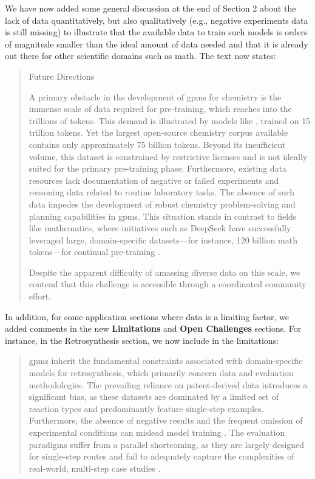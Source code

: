\begin{reply}

We have now added some general discussion at the end of Section 2 about the lack of data quantitatively, but also qualitatively (e.g., negative experiments data is still missing) to illustrate that the available data to train such models is orders of magnitude smaller than the ideal amount of data needed and that it is already out there for other scientific domains such as math. The text now states:

\begin{quote}
    Future Directions

    A primary obstacle in the development of \glspl{gpm} for chemistry is the immense scale of data required for pre-training, which reaches into the trillions of tokens. This demand is illustrated by models like , trained on 15 trillion tokens. Yet the largest open-source chemistry corpus available contains only approximately 75 billion tokens.\autocite{mirza2025chempile0} 
    Beyond its insufficient volume, this dataset is constrained by restrictive licenses and is not ideally suited for the primary pre-training phase. Furthermore, existing data resources lack documentation of negative or failed experiments and reasoning data related to routine laboratory tasks. The absence of such data impedes the development of robust chemistry problem-solving and planning capabilities in \glspl{gpm}. 
    This situation stands in contrast to fields like mathematics, where initiatives such as DeepSeek have successfully leveraged large, domain-specific datasets---for instance, 120 billion math tokens---for continual pre-training \autocite{shao2024deepseekmath0}.
    
    Despite the apparent difficulty of amassing diverse data on this scale, we contend that this challenge is accessible through a coordinated community effort. 
\end{quote}

In addition, for some application sections where data is a limiting factor, we added comments in the new \textbf{Limitations} and \textbf{Open Challenges} sections. For instance, in the Retrosynthesis section, we now include in the limitations:

\begin{quote}
    \glspl{gpm} inherit the fundamental constraints associated with domain-specific models for retrosynthesis, which primarily concern data and evaluation methodologies. The prevailing reliance on patent-derived data introduces a significant bias, as these datasets are dominated by a limited set of reaction types and predominantly feature single-step examples. Furthermore, the absence of negative results and the frequent omission of experimental conditions can mislead model training \autocite{Lee2024noise, Voinarovska2023when, Saebi2023onthe, Maloney2023negative, Tadanki2025dissecting}. The evaluation paradigms suffer from a parallel shortcoming, as they are largely designed for single-step routes and fail to adequately capture the complexities of real-world, multi-step case studies \autocite{TorrenPeraire2024models, maziarz2025re, liu2024evaluating}.


\end{quote}
\end{reply}
